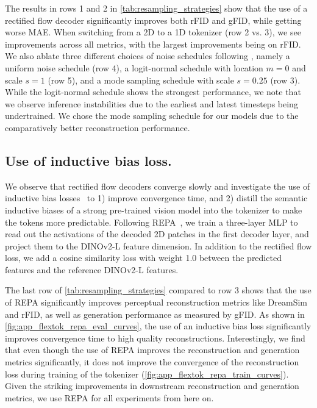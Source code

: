 The results in rows 1 and 2 in \cref{tab:resampling_strategies} show that the use of a rectified flow decoder significantly improves both rFID and gFID, while getting worse MAE. When switching from a 2D to a 1D tokenizer (row 2 vs. 3), we see improvements across all metrics, with the largest improvements being on rFID. We also ablate three different choices of noise schedules following \citet{Esser2024SD3}, namely a uniform noise schedule (row 4), a logit-normal schedule with location $m=0$ and scale $s=1$ (row 5), and a mode sampling schedule with scale $s=0.25$ (row 3). While the logit-normal schedule shows the strongest performance, we note that we observe inference instabilities due to the earliest and latest timesteps being undertrained. We chose the mode sampling schedule for our models due to the comparatively better reconstruction performance.


\subsection{Use of inductive bias loss.}
We observe that rectified flow decoders converge slowly and investigate the use of inductive bias losses~\cite{Hu2023GAIA1AG, Yu2024REPA} to 1) improve convergence time, and 2) distill the semantic inductive biases of a strong pre-trained vision model into the tokenizer to make the tokens more predictable. Following REPA~\cite{Yu2024REPA}, we train a three-layer MLP to read out the activations of the decoded 2D patches in the first decoder layer, and project them to the DINOv2-L feature dimension. In addition to the rectified flow loss, we add a cosine similarity loss with weight 1.0 between the predicted features and the reference DINOv2-L features. 

The last row of \cref{tab:resampling_strategies} compared to row 3 shows that the use of REPA significantly improves perceptual reconstruction metrics like DreamSim and rFID, as well as generation performance as measured by gFID. As shown in \cref{fig:app_flextok_repa_eval_curves}, the use of an inductive bias loss significantly improves convergence time to high quality reconstructions. Interestingly, we find that even though the use of REPA improves the reconstruction and generation metrics significantly, it does not improve the convergence of the reconstruction loss during training of the tokenizer (\cref{fig:app_flextok_repa_train_curves}). Given the striking improvements in downstream reconstruction and generation metrics, we use REPA for all experiments from here on.


